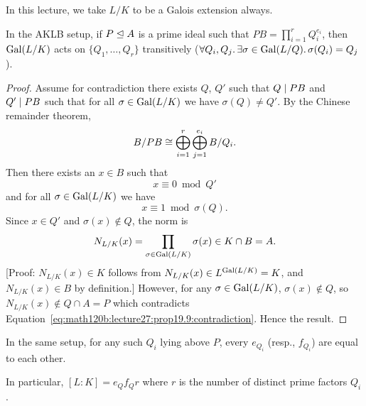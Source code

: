
\lecture{}

In this lecture, we take $L/K$ to be a Galois extension always.

\begin{proposition}\label{prop:19.9}
In the AKLB setup, if $P\mathrel{\trianglelefteq} A$ is a prime ideal such that
$PB=\prod^{r}_{i=1}Q_{i}^{e_{i}}$, then $\operatorname{Gal}(L/K)$ acts on
$\{Q_{1},\dots,Q_{r}\}$ transitively ($\forall Q_{i},Q_{j}\ldotp\exists\sigma\in\operatorname{Gal}(L/Q)\ldotp\sigma(Q_{i})=Q_{j}$).
\end{proposition}

\begin{proof}
Assume for contradiction there exists $Q$, $Q'$ such that $Q\mid PB$
and $Q'\mid PB$ such that for all $\sigma\in\operatorname{Gal}(L/K)$ we have
$\sigma(Q)\neq Q'$. By the Chinese remainder theorem,
\begin{equation}
B/PB\cong\bigoplus^{r}_{i=1}\bigoplus^{e_{i}}_{j=1}B/Q_{i}.
\end{equation}
Then there exists an $x\in B$ such that
\begin{equation}
x\equiv0\bmod{Q'}
\end{equation}
and for all $\sigma\in\operatorname{Gal}(L/K)$ we have
\begin{equation}
x\equiv1\bmod{\sigma(Q)}.
\end{equation}
Since $x\in Q'$ and $\sigma(x)\notin Q$, the norm is
\begin{equation}\label{eq:math120b:lecture27:prop19.9:contradiction}
N_{L/K}(x)=\prod_{\sigma\in\operatorname{Gal}(L/K)}\sigma(x)\in K\cap B=A.
\end{equation}
[Proof: $N_{L/K}(x)\in K$ follows from $N_{L/K}(x)\in L^{\operatorname{Gal}(L/K)}=K$, and $N_{L/K}(x)\in B$ by definition.]
However, for any $\sigma\in\operatorname{Gal}(L/K)$, $\sigma(x)\notin Q$, so
$N_{L/K}(x)\notin Q\cap A=P$ which contradicts Equation~\eqref{eq:math120b:lecture27:prop19.9:contradiction}.
Hence the result.
\end{proof}

\begin{corollary}\label{cor:19.10}
In the same setup, for any such $Q_{i}$ lying above $P$, every
$e_{Q_{i}}$ (resp., $f_{Q_{i}}$) are equal to each other.

In particular, $[L:K]=e_{Q}f_{Q}r$ where $r$ is the number of distinct
prime factors $Q_{i}$.
\end{corollary}


